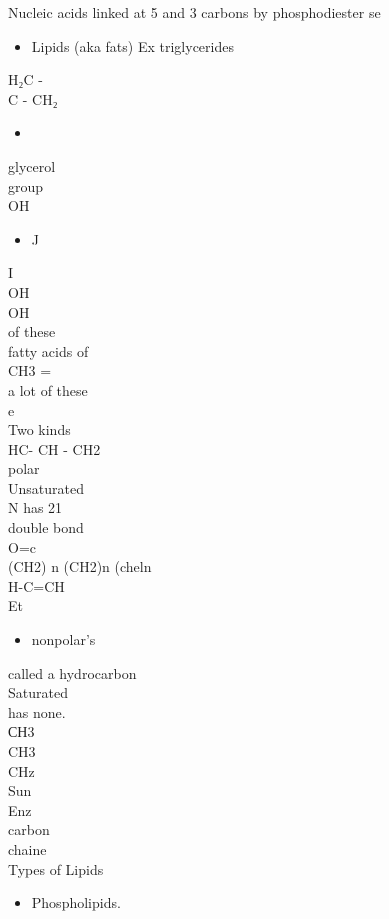 \documentclass{article}
\begin{document}
Nucleic acids linked at 5 and 3 carbons by phosphodiester se\\
\begin{itemize}
\item  Lipids (aka fats)
Ex triglycerides
\end{itemize}
H₂C -\\
C - CH₂\\
\begin{itemize}
\item 
\end{itemize}
glycerol\\
group\\
OH\\
\begin{itemize}
\item  J
\end{itemize}
I\\
OH\\
OH\\
of these\\
fatty acids of\\
CH3 =\\
a lot of these\\
e\\
Two kinds\\
HC- CH - CH2\\
polar\\
Unsaturated\\
N has 21\\
double bond\\
O=c\\
(CH2) n (CH2)n (cheln\\
H-C=CH\\
Et\\
\begin{itemize}
\item nonpolar's
\end{itemize}
called a hydrocarbon\\
Saturated\\
has none.\\
СН3\\
CH3\\
CHz\\
Sun\\
Enz\\
carbon\\
chaine\\
Types of Lipids
\begin{itemize}
\item  Phospholipids.
\end{itemize}
\end{document}
